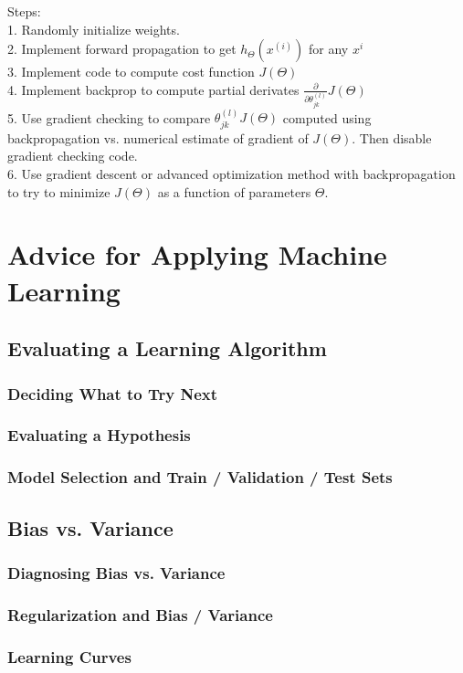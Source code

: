\documentclass{article}
\begin{document}
Steps:\\
1. Randomly initialize weights.\\
2. Implement forward propagation to get $h_\Theta(x^{(i)})$ for any $x^i$\\
3. Implement code to compute cost function $J(\Theta)$ \\
4. Implement backprop to compute partial derivates $\frac{\partial}{\partial \theta_{jk}^{(l)}} J(\Theta)$ \\
5. Use gradient checking to compare $\theta_{jk}^{(l)} J(\Theta)$ computed using backpropagation vs. numerical estimate of gradient of $J(\Theta)$. Then disable gradient checking code.\\
6. Use gradient descent or advanced optimization method with backpropagation to try to minimize $J(\Theta)$ as a function of parameters $\Theta$.

\newpage

\section{Advice for Applying Machine Learning}
\subsection{Evaluating a Learning Algorithm}
\subsubsection{Deciding What to Try Next}
\subsubsection{Evaluating a Hypothesis}
\subsubsection{Model Selection and Train / Validation / Test Sets}
\subsection{Bias vs. Variance}
\subsubsection{Diagnosing Bias vs. Variance}
\subsubsection{Regularization and Bias / Variance}
\subsubsection{Learning Curves}
\end{document}

